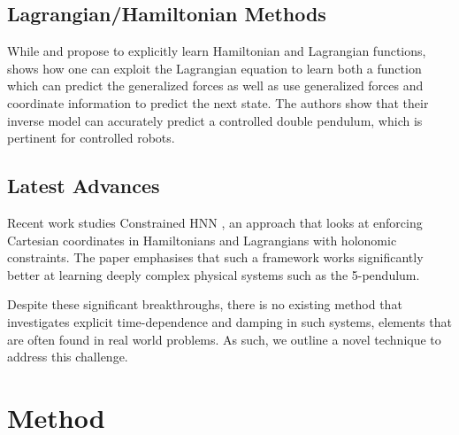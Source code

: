 \documentclass{article}
\begin{document}
\subsection*{Lagrangian/Hamiltonian Methods}
While \cite{cranmer_lagrangian_2020} and \cite{greydanus_hamiltonian_2019} propose to explicitly learn Hamiltonian and Lagrangian functions, \cite{lutter_deep_2019} shows how one can exploit the Lagrangian equation to learn both a function which can predict the generalized forces as well as use generalized forces and coordinate information to predict the next state. The authors show that their inverse model can accurately predict a controlled double pendulum, which is pertinent for controlled robots.

\subsection*{Latest Advances}
Recent work studies Constrained HNN \cite{finzi_generalizing_2020}, an approach that looks at enforcing Cartesian coordinates in Hamiltonians and Lagrangians with holonomic constraints. The paper emphasises that such a framework works significantly better at learning deeply complex physical systems such as the 5-pendulum. 

Despite these significant breakthroughs, there is no existing method that investigates explicit time-dependence and damping in such systems, elements that are often found in real world problems. As such, we outline a novel technique to address this challenge.

\section{Method}
\end{document}
